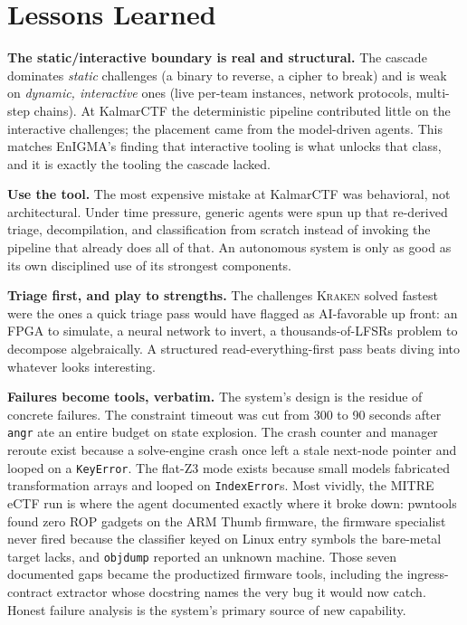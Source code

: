 \documentclass[10pt,twocolumn]{article}
\newcommand{\kraken}{\textsc{Kraken}}
\newcommand{\code}[1]{\seqsplit{\texttt{#1}}}
\begin{document}
\section{Lessons Learned}
\label{sec:lessons}

\textbf{The static/interactive boundary is real and structural.} The cascade dominates \emph{static}
challenges (a binary to reverse, a cipher to break) and is weak on \emph{dynamic, interactive} ones (live
per-team instances, network protocols, multi-step chains). At KalmarCTF the deterministic pipeline
contributed little on the interactive challenges; the placement came from the model-driven agents. This
matches EnIGMA's finding \cite{abramovich2025enigma} that interactive tooling is what unlocks that class, and
it is exactly the tooling the cascade lacked.

\medskip
\textbf{Use the tool.} The most expensive mistake at KalmarCTF was behavioral, not architectural. Under time
pressure, generic agents were spun up that re-derived triage, decompilation, and classification from scratch
instead of invoking the pipeline that already does all of that. An autonomous system is only as good as its
own disciplined use of its strongest components.

\medskip
\textbf{Triage first, and play to strengths.} The challenges \kraken{} solved fastest were the ones a quick
triage pass would have flagged as AI-favorable up front: an FPGA to simulate, a neural network to invert, a
thousands-of-LFSRs problem to decompose algebraically. A structured read-everything-first pass beats diving
into whatever looks interesting.

\medskip
\textbf{Failures become tools, verbatim.} The system's design is the residue of concrete failures. The
constraint timeout was cut from 300 to 90 seconds after \texttt{angr} ate an entire budget on state
explosion. The crash counter and manager reroute exist because a solve-engine crash once left a stale
next-node pointer and looped on a \texttt{KeyError}. The flat-Z3 mode exists because small models fabricated
transformation arrays and looped on \texttt{IndexError}s. Most vividly, the MITRE eCTF run is where the agent
documented exactly where it broke down: pwntools found zero ROP gadgets on the ARM Thumb firmware, the
firmware specialist never fired because the classifier keyed on Linux entry symbols the bare-metal target
lacks, and \texttt{objdump} reported an unknown machine. Those seven documented gaps became the productized
firmware tools, including the ingress-contract extractor whose docstring names the very \code{read\_packet}
bug it would now catch. Honest failure analysis is the system's primary source of new capability.
\end{document}
